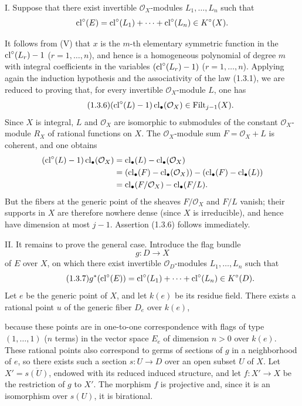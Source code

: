 I. Suppose that there exist invertible $\mathcal O_X$-modules
$L_1,\ldots,L_n$ such that
\[
\operatorname{cl}^\circ(E)=\operatorname{cl}^\circ(L_1)+\cdots+\operatorname{cl}^\circ(L_n)\in K^\circ(X).
\]

It follows from (V) that $x$ is the $m$-th elementary symmetric function in
the $\operatorname{cl}^\circ(L_r)-1$ ($r=1,\ldots,n$), and hence is a homogeneous
polynomial of degree $m$ with integral coefficients in the variables
$(\operatorname{cl}^\circ(L_r)-1)$ ($r=1,\ldots,n$). Applying again the induction
hypothesis and the associativity of the law (1.3.1), we are reduced to proving
that, for every invertible $\mathcal O_X$-module $L$, one has
\begin{equation}\tag{1.3.6}
(\operatorname{cl}^\circ(L)-1)\operatorname{cl}_\bullet(\mathcal O_X)\in\operatorname{Filt}_{j-1}(X).
\end{equation}
Since $X$ is integral, $L$ and $\mathcal O_X$ are isomorphic to submodules of
the constant $\mathcal O_X$-module $R_X$ of rational functions on $X$. The
$\mathcal O_X$-module sum $F=\mathcal O_X+L$ is coherent, and one obtains
\begin{align*}
(\operatorname{cl}^\circ(L)-1)\operatorname{cl}_\bullet(\mathcal O_X)
&=\operatorname{cl}_\bullet(L)-\operatorname{cl}_\bullet(\mathcal O_X)\\
&=(\operatorname{cl}_\bullet(F)-\operatorname{cl}_\bullet(\mathcal O_X))
  -(\operatorname{cl}_\bullet(F)-\operatorname{cl}_\bullet(L))\\
&=\operatorname{cl}_\bullet(F/\mathcal O_X)-\operatorname{cl}_\bullet(F/L).
\end{align*}
But the fibers at the generic point of the sheaves $F/\mathcal O_X$ and
$F/L$ vanish; their supports in $X$ are therefore nowhere dense (since $X$
is irreducible), and hence have dimension at most $j-1$. Assertion (1.3.6)
follows immediately.

II. It remains to prove the general case. Introduce the flag bundle
\[
g:D\longrightarrow X
\]
of $E$ over $X$, on which there exist invertible $\mathcal O_D$-modules
$L_1,\ldots,L_n$ such that
\begin{equation}\tag{1.3.7}
g^*(\operatorname{cl}^\circ(E))=\operatorname{cl}^\circ(L_1)+\cdots+\operatorname{cl}^\circ(L_n)\in K^\circ(D).
\end{equation}
Let $e$ be the generic point of $X$, and let $k(e)$ be its residue field.
There exists a rational point $u$ of the generic fiber $D_e$ over $k(e)$,

because these points are in one-to-one correspondence with flags of type
$(1,\ldots,1)$ ($n$ terms) in the vector space $E_e$ of dimension $n>0$ over
$k(e)$. These rational points also correspond to germs of sections of $g$ in
a neighborhood of $e$, so there exists such a section $s:U\to D$ over an
open subset $U$ of $X$. Let $X'=\overline{s(U)}$, endowed with its reduced
induced structure, and let $f:X'\to X$ be the restriction of $g$ to $X'$.
The morphism $f$ is projective and, since it is an isomorphism over $s(U)$,
it is birational.

